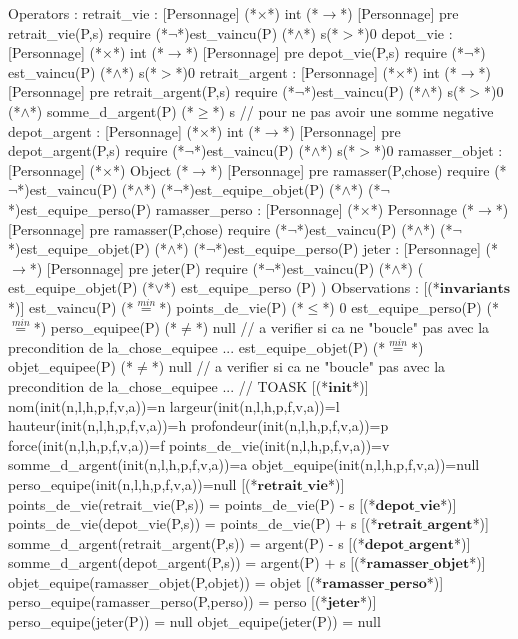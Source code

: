 \documentclass[a4paper, 11pt]{report}
\newcommand{\specB}[1]{\textbf{#1}}
\begin{document}
\begin{Spe}
Operators :
	retrait_vie :  [Personnage] (*$\times$*) int (*$\rightarrow$*) [Personnage]
		pre retrait_vie(P,s) require (*$\lnot$*)est_vaincu(P) (*$\land$*) s(*$>$*)0
	depot_vie : [Personnage] (*$\times$*) int (*$\rightarrow$*) [Personnage]
		pre depot_vie(P,s) require (*$\lnot$*) est_vaincu(P) (*$\land$*) s(*$>$*)0
	retrait_argent :  [Personnage] (*$\times$*) int (*$\rightarrow$*) [Personnage]
		pre retrait_argent(P,s) require (*$\lnot$*)est_vaincu(P) (*$\land$*) s(*$>$*)0 (*$\land$*) somme_d_argent(P) (*$\ge$*) s // pour ne pas avoir une somme negative
	depot_argent : [Personnage] (*$\times$*) int (*$\rightarrow$*) [Personnage]
		pre depot_argent(P,s) require (*$\lnot$*)est_vaincu(P) (*$\land$*) s(*$>$*)0
	ramasser_objet : [Personnage] (*$\times$*) Object (*$\rightarrow$*) [Personnage]
		pre ramasser(P,chose) require (*$\lnot$*)est_vaincu(P) (*$\land$*) (*$\lnot$*)est_equipe_objet(P) (*$\land$*)  (*$\lnot$*)est_equipe_perso(P)
        ramasser_perso : [Personnage] (*$\times$*) Personnage (*$\rightarrow$*) [Personnage]
		pre ramasser(P,chose) require (*$\lnot$*)est_vaincu(P) (*$\land$*) (*$\lnot$*)est_equipe_objet(P) (*$\land$*) (*$\lnot$*)est_equipe_perso(P)
	jeter : [Personnage] (*$\rightarrow$*) [Personnage]
		pre jeter(P) require (*$\lnot$*)est_vaincu(P) (*$\land$*) ( est_equipe_objet(P) (*$\lor$*) est_equipe_perso (P) )
Observations : 
	[(*$\specB{invariants}$*)]
		est_vaincu(P) (*$\stackrel{min}{=}$*) points_de_vie(P) (*$\le$*) 0
                est_equipe_perso(P) (*$\stackrel{min}{=}$*) perso_equipee(P) (*$\ne$*) null // a verifier si ca ne "boucle" pas avec la precondition de la_chose_equipee ...
		est_equipe_objet(P) (*$\stackrel{min}{=}$*) objet_equipee(P) (*$\ne$*) null // a verifier si ca ne "boucle" pas avec la precondition de la_chose_equipee ... // TOASK
	[(*$\specB{init}$*)]
		nom(init(n,l,h,p,f,v,a))=n
		largeur(init(n,l,h,p,f,v,a))=l
		hauteur(init(n,l,h,p,f,v,a))=h
		profondeur(init(n,l,h,p,f,v,a))=p
		force(init(n,l,h,p,f,v,a))=f
		points_de_vie(init(n,l,h,p,f,v,a))=v
		somme_d_argent(init(n,l,h,p,f,v,a))=a
                objet_equipe(init(n,l,h,p,f,v,a))=null
                perso_equipe(init(n,l,h,p,f,v,a))=null
	[(*$\specB{retrait\_vie}$*)]
		points_de_vie(retrait_vie(P,s)) = points_de_vie(P) - s
	[(*$\specB{depot\_vie}$*)]
		points_de_vie(depot_vie(P,s)) = points_de_vie(P) + s 
	[(*$\specB{retrait\_argent}$*)]
		somme_d_argent(retrait_argent(P,s)) = argent(P) - s 
	[(*$\specB{depot\_argent}$*)]
		somme_d_argent(depot_argent(P,s)) = argent(P) + s 
	[(*$\specB{ramasser\_objet}$*)]
		objet_equipe(ramasser_objet(P,objet)) = objet 
	[(*$\specB{ramasser\_perso}$*)]
		perso_equipe(ramasser_perso(P,perso)) = perso 
	[(*$\specB{jeter}$*)]
                perso_equipe(jeter(P)) = null
                objet_equipe(jeter(P)) = null
\end{Spe}
\end{document}
